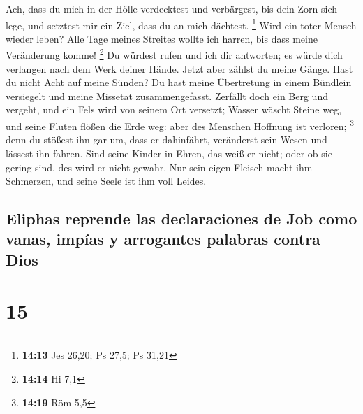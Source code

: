  Ach, dass du mich in der Hölle verdecktest und
verbärgest, bis dein Zorn sich lege, und setztest mir ein Ziel, dass du
an mich dächtest. \footnote{\textbf{14:13} Jes 26,20; Ps 27,5; Ps 31,21}
 Wird ein toter Mensch wieder leben? Alle Tage meines
Streites wollte ich harren, bis dass meine Veränderung komme!
\footnote{\textbf{14:14} Hi 7,1}  Du würdest rufen und
ich dir antworten; es würde dich verlangen nach dem Werk deiner Hände.
 Jetzt aber zählst du meine Gänge. Hast du nicht Acht auf
meine Sünden?  Du hast meine Übertretung in einem
Bündlein versiegelt und meine Missetat zusammengefasst. 
Zerfällt doch ein Berg und vergeht, und ein Fels wird von seinem Ort
versetzt;  Wasser wäscht Steine weg, und seine Fluten
flößen die Erde weg: aber des Menschen Hoffnung ist verloren;
\footnote{\textbf{14:19} Röm 5,5}  denn du stößest ihn
gar um, dass er dahinfährt, veränderst sein Wesen und lässest ihn
fahren.  Sind seine Kinder in Ehren, das weiß er nicht;
oder ob sie gering sind, des wird er nicht gewahr.  Nur
sein eigen Fleisch macht ihm Schmerzen, und seine Seele ist ihm voll
Leides.

\hypertarget{eliphas-reprende-las-declaraciones-de-job-como-vanas-impuxedas-y-arrogantes-palabras-contra-dios}{%
\subsection{Eliphas reprende las declaraciones de Job como vanas, impías
y arrogantes palabras contra
Dios}\label{eliphas-reprende-las-declaraciones-de-job-como-vanas-impuxedas-y-arrogantes-palabras-contra-dios}}

\hypertarget{section-14}{%
\section{15}\label{section-14}}

